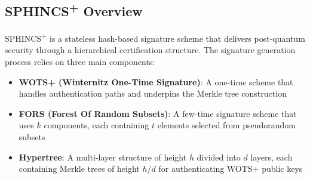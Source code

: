 \documentclass[journal]{IEEEtran}
\begin{document}
\subsection{\texorpdfstring{SPHINCS\textsuperscript{+}}{SPHINCS+} Overview}

SPHINCS\textsuperscript{+} is a stateless hash-based signature scheme that delivers post-quantum security through a hierarchical certification structure. The signature generation process relies on three main components:

\begin{itemize}
  \item \textbf{WOTS+ (Winternitz One-Time Signature)}: A one-time scheme that handles authentication paths and underpins the Merkle tree construction
  \item \textbf{FORS (Forest Of Random Subsets)}: A few-time signature scheme that uses $k$ components, each containing $t$ elements selected from pseudorandom subsets
  \item \textbf{Hypertree}: A multi-layer structure of height $h$ divided into $d$ layers, each containing Merkle trees of height $h/d$ for authenticating WOTS+ public keys
\end{itemize}
\end{document}
